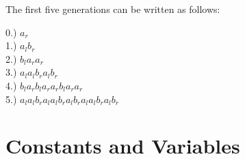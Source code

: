 \begin{flushleft}
\vspace{5mm}

The first five generations can be written as follows: \\

\vspace{5mm}

0.) $a_r$ \\
1.) $a_l b_r$ \\
2.) $b_l a_r a_r$ \\
3.) $a_l a_l b_r a_l b_r$ \\
4.) $b_l a_r b_l a_r a_r b_l a_r a_r$ \\
5.) $a_l a_l b_r a_l a_l b_r a_l b_r a_l a_l b_r a_l b_r$ \\

\vspace{5mm}



\end{flushleft}

\section{Constants and Variables} \label{constants variables}

